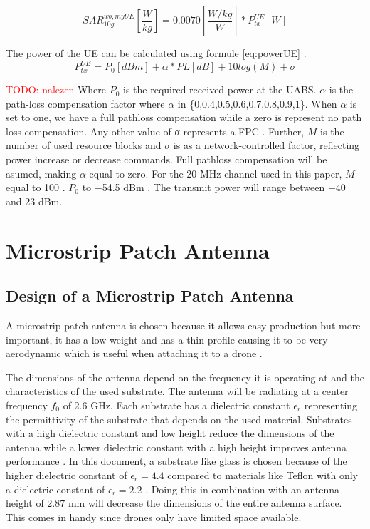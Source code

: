 \begin{equation} 
SAR^{wb,myUE}_{10g} \left[\frac{W}{kg}\right] = 0.0070 \left[\frac{W/kg}{W}\right] * P_{tx}^{UE} [W]
\label{eq:ulToSar}
\end{equation}

The power of the \gls{UE} can be calculated using formule \ref{eq:powerUE} \cite{J22_plets2015joint}.
\begin{equation} 
P_{tx}^{UE} = P_{0} [dBm] + \alpha * PL [dB] + 10log(M) + \sigma
\label{eq:powerUE}
\end{equation}

\textcolor{red}{TODO: nalezen}
Where $P_0$ is the required received power at the
\gls{UABS}. $\alpha$ is the path-loss compensation factor where 
$\alpha$ in \{0,0.4,0.5,0.6,0.7,0.8,0.9,1\}. When $\alpha$ is set to 
one, we have a full pathloss compensation while a zero is 
represent no path loss compensation. Any other value of α represents a FPC \cite{J32,J33}.
Further, $M$ is the number of  used resource blocks and $\sigma$ is 
 as a network-controlled factor, reflecting power
increase or decrease commands. 
Full pathloss compensation will be asumed, making $\alpha$ equal to zero. 
For the 20-MHz
channel used in this paper, $M$ equal to 100 \cite{32}. 
$P_0$
to −54.5 dBm \cite{J33}. The transmit power will range between
 −40 and 23 dBm.


\section{Microstrip Patch Antenna}
\subsection{Design of  a Microstrip Patch Antenna}
\label{sub:definingAntenna}
A microstrip patch antenna is chosen because it allows easy production but more important, it has a low weight 
and has a thin profile causing it to be very aerodynamic which is useful when attaching it to a drone \cite{J13_microstripadvantages}.

The dimensions of the antenna depend on the frequency it is operating at and the characteristics of the used substrate.
The antenna will be radiating at a center frequency $f_0$ of 2.6 GHz. Each substrate has a \gls{dielectric constant} $\epsilon_r$ representing 
the permittivity of the substrate that depends on the used material.
Substrates with a high \gls{dielectric constant} and low height 
reduce the dimensions of the antenna
while a lower \gls{dielectric constant} with a high height improves antenna performance \cite{J14_antennadesign,J15_antennadesign}. 
In this document, a substrate like glass 
is chosen because of the higher \gls{dielectric constant} of $\epsilon_r = 4.4$ compared to materials like Teflon with only a dielectric 
constant of $\epsilon_r = 2.2$ \cite{J14_antennadesign}. 
Doing this in combination with an antenna height of 2.87 mm will decrease the dimensions of the entire antenna surface.
This comes in handy since drones only have limited space available.

